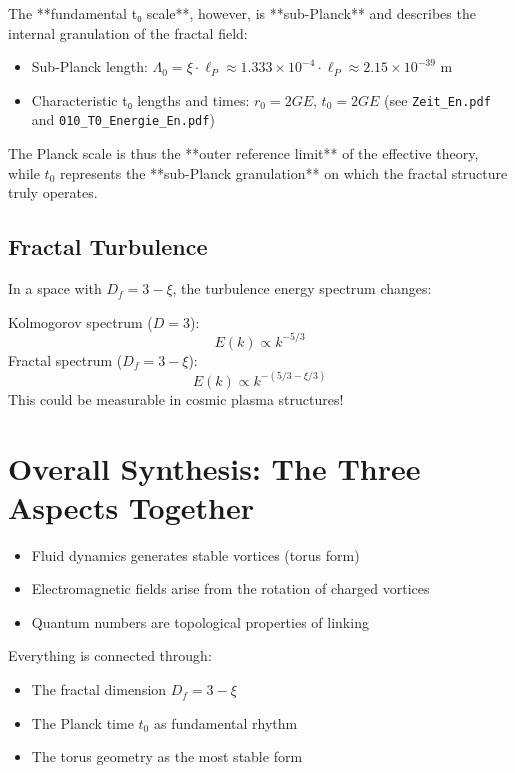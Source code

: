 \documentclass[12pt,a4paper]{article}
\begin{document}
The **fundamental t₀ scale**, however, is **sub-Planck** and describes the internal granulation of the fractal field:
\begin{itemize}
	\item Sub-Planck length: \( \Lambda_0 = \xi \cdot \ell_P \approx 1.333 \times 10^{-4} \cdot \ell_P \approx 2.15 \times 10^{-39} \) m
	\item Characteristic t₀ lengths and times: \( r_0 = 2GE \), \( t_0 = 2GE \) (see \texttt{Zeit\_En.pdf} and \texttt{010\_T0\_Energie\_En.pdf})
\end{itemize}

The Planck scale is thus the **outer reference limit** of the effective theory, while \( t_0 \) represents the **sub-Planck granulation** on which the fractal structure truly operates.

\subsection{Fractal Turbulence}
In a space with \( D_f = 3 - \xi \), the turbulence energy spectrum changes:

Kolmogorov spectrum (\( D = 3 \)):
\[
E(k) \propto k^{-5/3}
\]
Fractal spectrum (\( D_f = 3 - \xi \)):
\[
E(k) \propto k^{-(5/3 - \xi/3)}
\]
This could be measurable in cosmic plasma structures!

\section{Overall Synthesis: The Three Aspects Together}
\begin{itemize}
	\item Fluid dynamics generates stable vortices (torus form)
	\item Electromagnetic fields arise from the rotation of charged vortices
	\item Quantum numbers are topological properties of linking
\end{itemize}

Everything is connected through:
\begin{itemize}
	\item The fractal dimension \( D_f = 3 - \xi \)
	\item The Planck time \( t_0 \) as fundamental rhythm
	\item The torus geometry as the most stable form
\end{itemize}
\end{document}
